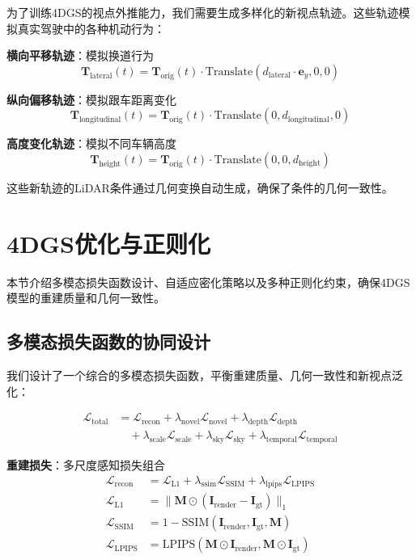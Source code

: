 为了训练4DGS的视点外推能力，我们需要生成多样化的新视点轨迹。这些轨迹模拟真实驾驶中的各种机动行为：

\textbf{横向平移轨迹}：模拟换道行为
\begin{equation}
\mathbf{T}_{\text{lateral}}(t) = \mathbf{T}_{\text{orig}}(t) \cdot \text{Translate}(d_{\text{lateral}} \cdot \mathbf{e}_y, 0, 0)
\label{eq:lateral_trajectory}
\end{equation}

\textbf{纵向偏移轨迹}：模拟跟车距离变化
\begin{equation}
\mathbf{T}_{\text{longitudinal}}(t) = \mathbf{T}_{\text{orig}}(t) \cdot \text{Translate}(0, d_{\text{longitudinal}}, 0)
\label{eq:longitudinal_trajectory}
\end{equation}

\textbf{高度变化轨迹}：模拟不同车辆高度
\begin{equation}
\mathbf{T}_{\text{height}}(t) = \mathbf{T}_{\text{orig}}(t) \cdot \text{Translate}(0, 0, d_{\text{height}})
\label{eq:height_trajectory}
\end{equation}

这些新轨迹的LiDAR条件通过几何变换自动生成，确保了条件的几何一致性。

\section{4DGS优化与正则化}

本节介绍多模态损失函数设计、自适应密化策略以及多种正则化约束，确保4DGS模型的重建质量和几何一致性。

\subsection{多模态损失函数的协同设计}

我们设计了一个综合的多模态损失函数，平衡重建质量、几何一致性和新视点泛化：

\begin{align}
\mathcal{L}_{\text{total}} &= \mathcal{L}_{\text{recon}} + \lambda_{\text{novel}} \mathcal{L}_{\text{novel}} + \lambda_{\text{depth}} \mathcal{L}_{\text{depth}} \\
&\quad + \lambda_{\text{scale}} \mathcal{L}_{\text{scale}} + \lambda_{\text{sky}} \mathcal{L}_{\text{sky}} + \lambda_{\text{temporal}} \mathcal{L}_{\text{temporal}}
\label{eq:comprehensive_loss}
\end{align}

\textbf{重建损失}：多尺度感知损失组合
\begin{align}
\mathcal{L}_{\text{recon}} &= \mathcal{L}_{\text{L1}} + \lambda_{\text{ssim}} \mathcal{L}_{\text{SSIM}} + \lambda_{\text{lpips}} \mathcal{L}_{\text{LPIPS}} \\
\mathcal{L}_{\text{L1}} &= \|\mathbf{M} \odot (\mathbf{I}_{\text{render}} - \mathbf{I}_{\text{gt}})\|_1 \\
\mathcal{L}_{\text{SSIM}} &= 1 - \text{SSIM}(\mathbf{I}_{\text{render}}, \mathbf{I}_{\text{gt}}, \mathbf{M}) \\
\mathcal{L}_{\text{LPIPS}} &= \text{LPIPS}(\mathbf{M} \odot \mathbf{I}_{\text{render}}, \mathbf{M} \odot \mathbf{I}_{\text{gt}})
\label{eq:reconstruction_loss_detailed}
\end{align}


